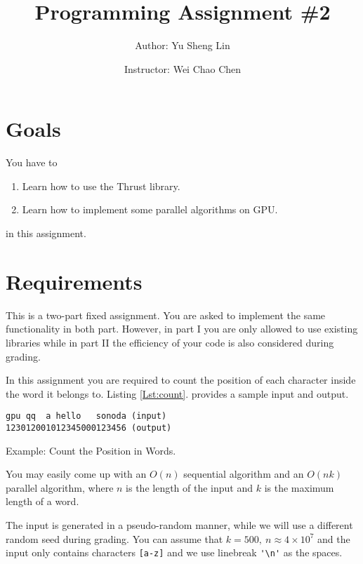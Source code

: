 \documentclass[12pt,a4paper]{article}
\renewcommand{\_}{\textscale{.5}{\textunderscore}}
\newcommand{\lstref}[1]{Listing \ref{Lst:#1}.}
\begin{document}
\title{Programming Assignment \#2}
\author{Author: Yu Sheng Lin \and Instructor: Wei Chao Chen}
\maketitle

\section{Goals}

You have to

\begin{enumerate}
\item Learn how to use the Thrust library.
\item Learn how to implement some parallel algorithms on GPU.
\end{enumerate}

in this assignment.

\section{Requirements}

This is a two-part fixed assignment.
You are asked to implement the same functionality in both part.
However, in part I you are only allowed to use existing libraries
while in part II the efficiency of your code is also considered during grading.

In this assignment you are required to count the position
of each character inside the word it belongs to.
\lstref{count} provides a sample input and output.

\begin{listing}[ht]
\begin{verbatim}
gpu qq  a hello   sonoda (input)
123012001012345000123456 (output)
\end{verbatim}
\caption{Example: Count the Position in Words.}\label{Lst:count}
\end{listing}

You may easily come up with an $O(n)$ sequential algorithm
and an $O(nk)$ parallel algorithm,
where $n$ is the length of the input and $k$ is the maximum length of a word.

The input is generated in a pseudo-random manner,
while we will use a different random seed during grading.
You can assume that $k=500,~n\approx 4\times10^7$ and
the input only contains characters \verb+[a-z]+
and we use linebreak \verb+'\n'+ as the spaces.
\end{document}

